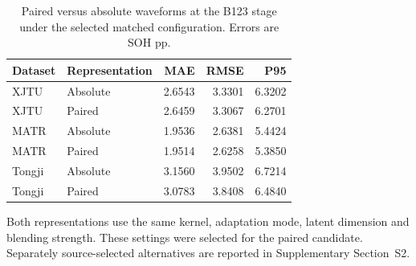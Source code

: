 \begin{table}[!htbp]\centering
\caption{Paired versus absolute waveforms at the B123 stage under the selected matched configuration. Errors are SOH pp.}\label{tab:m3matched}
\papertablesize\setlength{\tabcolsep}{4pt}\renewcommand{\arraystretch}{1.15}
\begin{tabular}{llrrr}\toprule
Dataset & Representation & MAE & RMSE & P95 \\ \midrule
XJTU & Absolute & 2.6543 & 3.3301 & 6.3202 \\
XJTU & Paired & 2.6459 & 3.3067 & 6.2701 \\
MATR & Absolute & 1.9536 & 2.6381 & 5.4424 \\
MATR & Paired & 1.9514 & 2.6258 & 5.3850 \\
Tongji & Absolute & 3.1560 & 3.9502 & 6.7214 \\
Tongji & Paired & 3.0783 & 3.8408 & 6.4840 \\
\bottomrule\end{tabular}
\par\smallskip\begin{minipage}{\linewidth}\papertablesize Both representations use the same kernel, adaptation mode, latent dimension and blending strength. These settings were selected for the paired candidate. Separately source-selected alternatives are reported in Supplementary Section~S2.\end{minipage}
\end{table}
